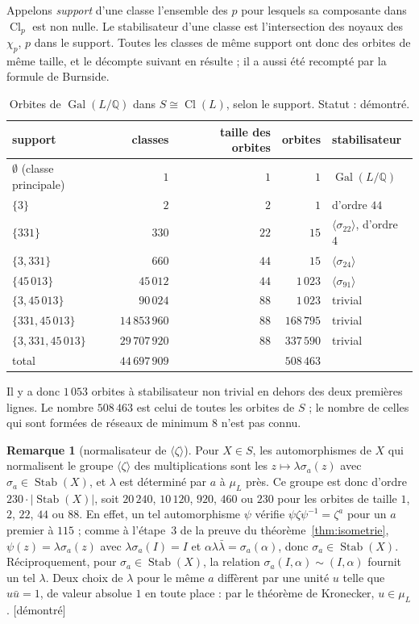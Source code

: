 \documentclass[11pt,a4paper]{amsart}
\theoremstyle{plain}
\theoremstyle{definition}
\newtheorem{remarque}[theoreme]{Remarque}
\numberwithin{equation}{section}
\newcommand{\Q}{\mathbb{Q}}
\DeclareMathOperator{\Cl}{Cl}
\DeclareMathOperator{\Gal}{Gal}
\DeclareMathOperator{\Stab}{Stab}
\newcommand{\st}[1]{\textup{\textsf{\small[#1]}}}
\newcommand{\DEM}{\st{démontré}}
\begin{document}
Appelons \emph{support} d'une classe l'ensemble des $p$ pour lesquels sa composante dans $\Cl_p$ est non nulle. Le stabilisateur d'une classe est l'intersection des noyaux des $\chi_p$, $p$ dans le support. Toutes les classes de même support ont donc des orbites de même taille, et le décompte suivant en résulte ; il a aussi été recompté par la formule de Burnside.

\begin{table}[ht]
\caption{Orbites de $\Gal(L/\Q)$ dans $S\cong\Cl(L)$, selon le support. Statut : démontré.}\label{tab:orbites}
\centering\small
\begin{tabular}{lrrrl}
\toprule
support & classes & taille des orbites & orbites & stabilisateur \\
\midrule
$\emptyset$ (classe principale) & $1$ & $1$ & $1$ & $\Gal(L/\Q)$ \\
$\{3\}$ & $2$ & $2$ & $1$ & d'ordre $44$ \\
$\{331\}$ & $330$ & $22$ & $15$ & $\langle\sigma_{22}\rangle$, d'ordre $4$ \\
$\{3,331\}$ & $660$ & $44$ & $15$ & $\langle\sigma_{24}\rangle$ \\
$\{45\,013\}$ & $45\,012$ & $44$ & $1\,023$ & $\langle\sigma_{91}\rangle$ \\
$\{3,45\,013\}$ & $90\,024$ & $88$ & $1\,023$ & trivial \\
$\{331,45\,013\}$ & $14\,853\,960$ & $88$ & $168\,795$ & trivial \\
$\{3,331,45\,013\}$ & $29\,707\,920$ & $88$ & $337\,590$ & trivial \\
\midrule
total & $44\,697\,909$ & & $508\,463$ & \\
\bottomrule
\end{tabular}
\end{table}

Il y a donc $1\,053$ orbites à stabilisateur non trivial en dehors des deux premières lignes. Le nombre $508\,463$ est celui de toutes les orbites de $S$ ; le nombre de celles qui sont formées de réseaux de minimum $8$ n'est pas connu.

\begin{remarque}[normalisateur de $\langle\zeta\rangle$]\label{rem:normalisateur}
Pour $X\in S$, les automorphismes de $X$ qui normalisent le groupe $\langle\zeta\rangle$ des multiplications sont les $z\mapsto\lambda\sigma_a(z)$ avec $\sigma_a\in\Stab(X)$, et $\lambda$ est déterminé par $a$ à $\mu_L$ près. Ce groupe est donc d'ordre $230\cdot|\Stab(X)|$, soit $20\,240$, $10\,120$, $920$, $460$ ou $230$ pour les orbites de taille $1$, $2$, $22$, $44$ ou $88$. En effet, un tel automorphisme $\psi$ vérifie $\psi\zeta\psi^{-1}=\zeta^a$ pour un $a$ premier à $115$ ; comme à l'étape~3 de la preuve du théorème~\ref{thm:isometrie}, $\psi(z)=\lambda\sigma_a(z)$ avec $\lambda\sigma_a(I)=I$ et $\alpha\lambda\bar\lambda=\sigma_a(\alpha)$, donc $\sigma_a\in\Stab(X)$. Réciproquement, pour $\sigma_a\in\Stab(X)$, la relation $\sigma_a(I,\alpha)\sim(I,\alpha)$ fournit un tel $\lambda$. Deux choix de $\lambda$ pour le même $a$ diffèrent par une unité $u$ telle que $u\bar u=1$, de valeur absolue $1$ en toute place : par le théorème de Kronecker, $u\in\mu_L$. \DEM
\end{remarque}
\end{document}
